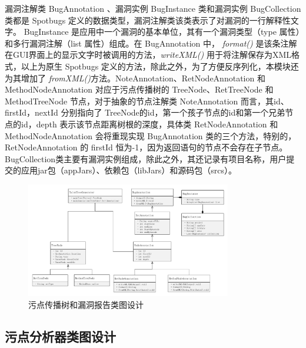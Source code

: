 漏洞注解类 BugAnnotation 、漏洞实例 BugInstance 类和漏洞实例 BugCollection 类都是 Spotbugs 定义的数据类型，漏洞注解类该类表示了对漏洞的一行解释性文字。
BugInstance 是应用中一个漏洞的基本单位，其有一个漏洞类型（type 属性）和多行漏洞注解（list 属性）组成。在 BugAnnotation 中， \textit{format()} 是该条注解在GUI界面上的显示文字时被调用的方法，\textit{writeXML()} 用于将注解保存为XML格式，以上为原生 Spotbugs 定义的方法，除此之外，为了方便反序列化，本模块还为其增加了 \textit{fromXML()}方法。NoteAnnotation、RetNodeAnnotation 和 MethodNodeAnnotation 对应于污点传播树的 TreeNode、RetTreeNode 和 MethodTreeNode 节点，对于抽象的节点注解类 NoteAnnotation 而言，其id、firstId，nextId 分别指向了 TreeNode的id，第一个孩子节点的id和第一个兄弟节点的id，depth 表示该节点距离树根的深度，具体类 RetNodeAnnotation 和 MethodNodeAnnotation 会将重现实现 BugAnnotation 类的三个方法，特别的，RetNodeAnnotation 的 firstId 恒为-1，因为返回语句的节点不会存在子节点。BugCollection类主要有漏洞实例组成，除此之外，其还记录有项目名称，用户提交的应用jar包（appJars）、依赖包（libJars）和源码包（srcs）。


\begin{figure}[!htb]
	\centering
	\includegraphics[width=0.8\textwidth]{FIGs/chapter3/taintTreeAnnotationClass.pdf}
	\caption{污点传播树和漏洞报告类图设计}\label{taintTreeAnnotationClass}
\end{figure}

\subsection{污点分析器类图设计}

